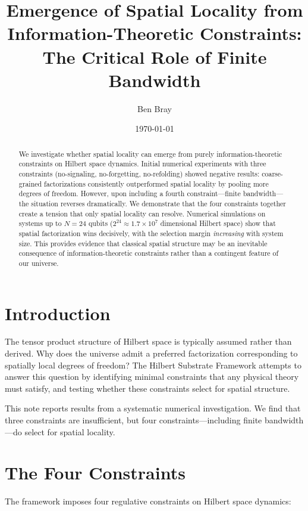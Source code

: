\documentclass[11pt]{article}
\title{Emergence of Spatial Locality from Information-Theoretic Constraints:\\
The Critical Role of Finite Bandwidth}
\author{Ben Bray}
\date{\today}
\begin{document}
\maketitle

\begin{abstract}
We investigate whether spatial locality can emerge from purely information-theoretic 
constraints on Hilbert space dynamics. Initial numerical experiments with three 
constraints (no-signaling, no-forgetting, no-refolding) showed negative results: 
coarse-grained factorizations consistently outperformed spatial locality by pooling 
more degrees of freedom. However, upon including a fourth constraint---finite 
bandwidth---the situation reverses dramatically. We demonstrate that the four 
constraints together create a tension that only spatial locality can resolve. 
Numerical simulations on systems up to $N=24$ qubits ($2^{24} \approx 1.7 \times 10^7$ 
dimensional Hilbert space) show that spatial factorization wins decisively, with 
the selection margin \emph{increasing} with system size. This provides evidence 
that classical spatial structure may be an inevitable consequence of 
information-theoretic constraints rather than a contingent feature of our universe.
\end{abstract}

\section{Introduction}

The tensor product structure of Hilbert space is typically assumed rather than 
derived. Why does the universe admit a preferred factorization corresponding to 
spatially local degrees of freedom? The Hilbert Substrate Framework attempts to 
answer this question by identifying minimal constraints that any physical theory 
must satisfy, and testing whether these constraints select for spatial structure.

This note reports results from a systematic numerical investigation. We find that 
three constraints are insufficient, but four constraints---including finite 
bandwidth---do select for spatial locality.

\section{The Four Constraints}

The framework imposes four regulative constraints on Hilbert space dynamics:
\end{document}
